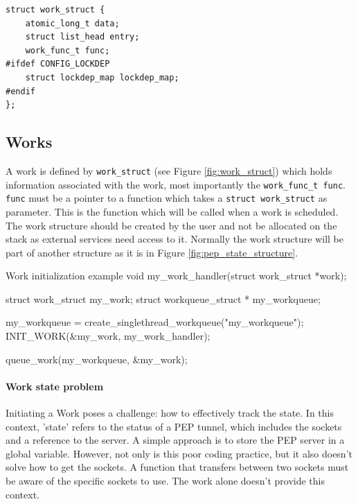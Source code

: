 \documentclass[a4paper,english, 11pt]{report}
\begin{document}
\noindent\begin{minipage}{\linewidth}
\begin{verbatim}
struct work_struct {
    atomic_long_t data;
    struct list_head entry;
    work_func_t func;
#ifdef CONFIG_LOCKDEP
    struct lockdep_map lockdep_map;
#endif
};
\end{verbatim}
\label{fig:work_struct}
\end{minipage}

\subsection{Works}
A work is defined by \verb|work_struct| (see Figure \ref{fig:work_struct}) which holds information associated with the work, most importantly the \verb|work_func_t func|. \verb|func| must be a pointer to a function which takes a \verb|struct work_struct| as parameter. This is the function which will be called when a work is scheduled. The work structure should be created by the user and not be allocated on the stack as external services need access to it. Normally the work structure will be part of another structure as it is in Figure \ref{fig:pep_state_structure}.\\


\begin{autonumlstlisting}[label=lst:work_init]{Work initialization example}
void my_work_handler(struct work_struct *work);

struct work_struct my_work;
struct workqueue_struct * my_workqueue;

my_workqueue = create_singlethread_workqueue("my_workqueue");
INIT_WORK(&my_work, my_work_handler);

queue_work(my_workqueue, &my_work);
\end{autonumlstlisting}

\paragraph{Work state problem}
Initiating a Work poses a challenge: how to effectively track the state. In this context, 'state' refers to the status of a PEP tunnel, which includes the sockets and a reference to the server. A simple approach is to store the PEP server in a global variable. However, not only is this poor coding practice, but it also doesn't solve how to get the sockets. A function that transfers between two sockets must be aware of the specific sockets to use. The work alone doesn't provide this context.\\
\end{document}
